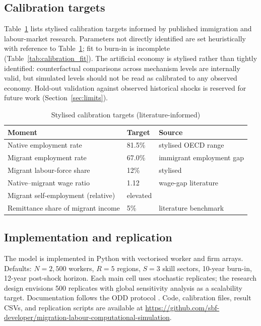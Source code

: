 \documentclass[11pt,a4paper]{article}
\begin{document}
\subsection{Calibration targets}

Table~\ref{tab:calibration} lists stylised calibration targets informed by published immigration and labour-market research.
Parameters not directly identified are set heuristically with reference to Table~\ref{tab:calibration}; fit to burn-in is incomplete (Table~\ref{tab:calibration_fit}).
The artificial economy is stylised rather than tightly identified: counterfactual comparisons across mechanism levels are internally valid, but simulated levels should not be read as calibrated to any observed economy.
Hold-out validation against observed historical shocks is reserved for future work (Section~\ref{sec:limits}).

\begin{table}[htbp]
  \centering
  \small
  \caption{Stylised calibration targets (literature-informed)}
  \label{tab:calibration}
  \begin{tabular}{@{}p{}p{}p{}@{}}
    \toprule
    Moment & Target & Source \\
    \midrule
    Native employment rate & 81.5\% & stylised OECD range \citep{borjas2016} \\
    Migrant employment rate & 67.0\% & immigrant employment gap \citep{dustmann2013} \\
    Migrant labour-force share & 12\% & stylised \citep{peri2016} \\
    Native--migrant wage ratio & 1.12 & wage-gap literature \citep{dustmann2013,borjas2016} \\
    Migrant self-employment (relative) & elevated & \citet{oecd2024entrepreneurship} \\
    Remittance share of migrant income & 5\% & literature benchmark \\
    \bottomrule
  \end{tabular}
\end{table}



\subsection{Implementation and replication}

The model is implemented in Python with vectorised worker and firm arrays.
Defaults: $N=2{,}500$ workers, $R=5$ regions, $S=3$ skill sectors, 10-year burn-in, 12-year post-shock horizon.
Each main cell uses \NReplicates{} stochastic replicates; the research design envisions 500 replicates with global sensitivity analysis \citep{saltelli2008} as a scalability target.
Documentation follows the ODD protocol \citep{grimm2010}.
Code, calibration files, result CSVs, and replication scripts are available at \url{https://github.com/sbf-developer/migration-labour-computational-simulation}.
\end{document}
